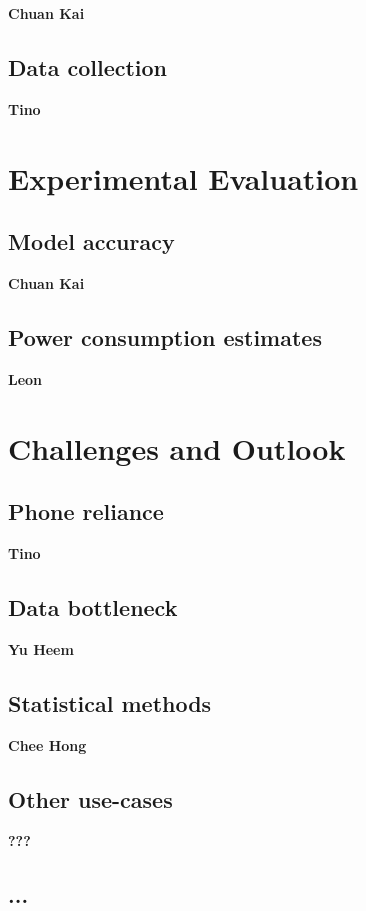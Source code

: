 \documentclass{article}
\begin{document}
\textbf{Chuan Kai}

\subsection{Data collection}

\textbf{Tino}

\section{Experimental Evaluation}

\subsection{Model accuracy}

\textbf{Chuan Kai}

\subsection{Power consumption estimates}

\textbf{Leon}

\section{Challenges and Outlook}

\subsection{Phone reliance}

\textbf{Tino}

\subsection{Data bottleneck}

\textbf{Yu Heem}

\subsection{Statistical methods}

\textbf{Chee Hong}

\subsection{Other use-cases}

\textbf{???}

\subsection{...}
\end{document}
